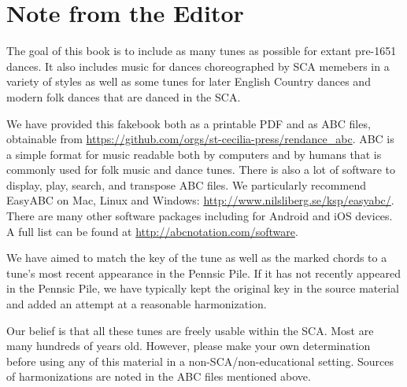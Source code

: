 \documentclass[11pt]{book}
\begin{document}


\frontmatter

\pagestyle{fancy}

\fancyhf{}

\fancyhead[LE,RO]{\thepage}
\renewcommand{\headrulewidth}{0pt}
\renewcommand{\footrulewidth}{0pt}
\setlength{\parindent}{0pt}
\setlength{\parskip}{11pt plus 2pt minus 2pt}

%
%
%
%
%
%

\section*{Note from the Editor}

The goal of this book is to include as many tunes as possible for extant
pre-1651 dances. It also includes music for dances choreographed by SCA
memebers in a variety of styles as well as some tunes for later English Country
dances and modern folk dances that are danced in the SCA.

We have provided this fakebook both as a printable PDF and as ABC files,
obtainable from \url{https://github.com/orgs/st-cecilia-press/rendance\_abc}.
ABC is a simple format for music readable both by computers and by humans that
is commonly used for folk music and dance tunes. There is also a lot of
software to display, play, search, and transpose ABC files. We particularly
recommend EasyABC on Mac, Linux and Windows:
\url{http://www.nilsliberg.se/ksp/easyabc/}. There are many other software
packages including for Android and iOS devices. A full list can be found at
\url{http://abcnotation.com/software}.

We have aimed to match the key of the tune as well as the marked chords to a
tune's most recent appearance in the Pennsic Pile. If it has not recently
appeared in the Pennsic Pile, we have typically kept the original key in the
source material and added an attempt at a reasonable harmonization.

Our belief is that all these tunes are freely usable within the SCA. Most are
many hundreds of years old. However, please make your own determination before
using any of this material in a non-SCA/non-educational setting. Sources of
harmonizations are noted in the ABC files mentioned above.
\end{document}
